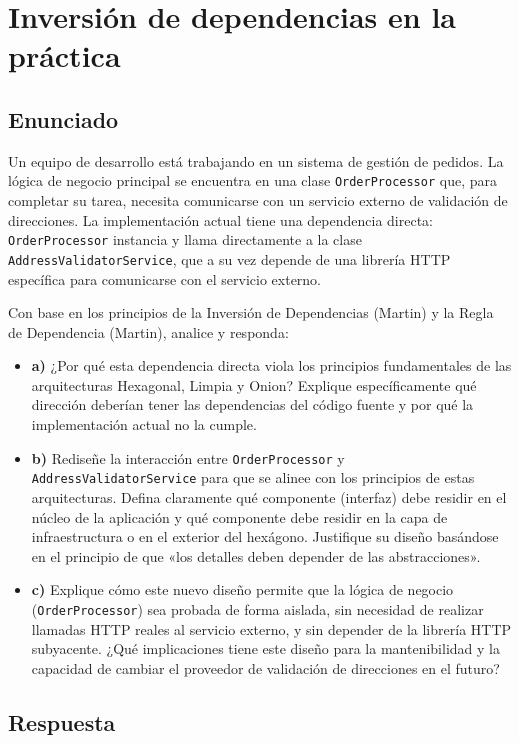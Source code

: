 \section{Inversión de dependencias en la práctica}

\subsection{Enunciado}
Un equipo de desarrollo está trabajando en un sistema de gestión de pedidos. La lógica de negocio
principal se encuentra en una clase \texttt{OrderProcessor} que, para completar su tarea,
necesita comunicarse con un servicio externo de validación de direcciones. La implementación
actual tiene una dependencia directa: \texttt{OrderProcessor} instancia y llama directamente a la
clase \texttt{AddressValidatorService}, que a su vez depende de una librería HTTP específica para
comunicarse con el servicio externo.

Con base en los principios de la Inversión de Dependencias (Martin) y la Regla de Dependencia
(Martin), analice y responda:

\begin{itemize}
  \item \textbf{a)} ¿Por qué esta dependencia directa viola los principios fundamentales de las
    arquitecturas Hexagonal, Limpia y Onion? Explique específicamente qué dirección deberían
    tener las dependencias del código fuente y por qué la implementación actual no la cumple.
  \item \textbf{b)} Rediseñe la interacción entre \texttt{OrderProcessor} y
    \texttt{AddressValidatorService} para que se alinee con los principios de estas
    arquitecturas. Defina claramente qué componente (interfaz) debe residir en el núcleo de la
    aplicación y qué componente debe residir en la capa de infraestructura o en el exterior del
    hexágono. Justifique su diseño basándose en el principio de que «los detalles deben depender
    de las abstracciones».
  \item \textbf{c)} Explique cómo este nuevo diseño permite que la lógica de negocio
    (\texttt{OrderProcessor}) sea probada de forma aislada, sin necesidad de realizar llamadas
    HTTP reales al servicio externo, y sin depender de la librería HTTP subyacente. ¿Qué
    implicaciones tiene este diseño para la mantenibilidad y la capacidad de cambiar el proveedor
    de validación de direcciones en el futuro?
\end{itemize}

\subsection{Respuesta}

